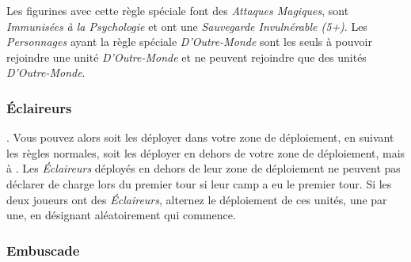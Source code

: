 Les figurines avec cette règle spéciale font des \emph{Attaques Magiques}, sont \emph{Immunisées à la Psychologie} et ont une \emph{Sauvegarde Invulnérable (5+)}. Les \emph{Personnages} ayant la règle spéciale \emph{D'Outre-Monde} sont les seuls à pouvoir rejoindre une unité \emph{D'Outre-Monde} et ne peuvent rejoindre que des unités \emph{D'Outre-Monde}.

\subsubsection*{Éclaireurs}

. Vous pouvez alors soit les déployer dans votre zone de déploiement, en suivant les règles normales, soit les déployer en dehors de votre zone de déploiement, mais à . Les \emph{Éclaireurs} déployés en dehors de leur zone de déploiement ne peuvent pas déclarer de charge lors du premier tour si leur camp a eu le premier tour. Si les deux joueurs ont des \emph{Éclaireurs}, alternez le déploiement de ces unités, une par une, en désignant aléatoirement qui commence.

\subsubsection*{Embuscade}

